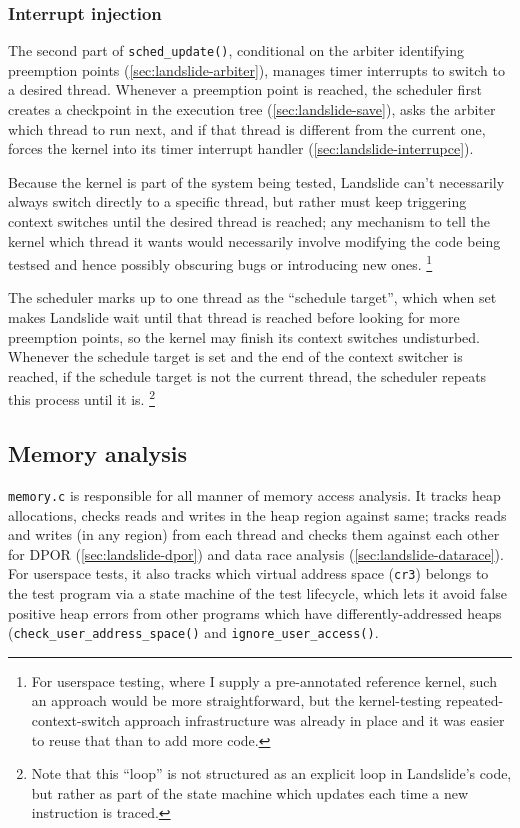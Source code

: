 \subsubsection{Interrupt injection}
\label{sec:landslide-scheduler-interrupce}

The second part of {\tt sched\_update()},
conditional on the arbiter identifying preemption points (\cref{sec:landslide-arbiter}),
manages timer interrupts to switch to a desired thread.
Whenever a preemption point is reached,
the scheduler first creates a checkpoint in the execution tree (\cref{sec:landslide-save}),
asks the arbiter which thread to run next,
and if that thread is different from the current one,
forces the kernel into its timer interrupt handler (\cref{sec:landslide-interrupce}).

Because the kernel is part of the system being tested, Landslide can't necessarily always switch directly to a specific thread,
but rather must keep triggering context switches until the desired thread is reached;
any mechanism to tell the kernel which thread it wants would necessarily involve modifying the code being testsed
and hence possibly obscuring bugs or introducing new ones.%
\footnote{For userspace testing, where I supply a pre-annotated reference kernel,
such an approach would be more straightforward,
but the kernel-testing repeated-context-switch approach infrastructure was already in place
and it was easier to reuse that than to add more code.}

The scheduler marks up to one thread as the ``schedule target'',
which when set makes Landslide wait until that thread is reached before looking for more preemption points,
so the kernel may finish its context switches undisturbed.
Whenever the schedule target is set and the end of the context switcher is reached,
if the schedule target is not the current thread,
the scheduler repeats this process until it is.%
\footnote{Note that this ``loop'' is not structured as an explicit loop in Landslide's code,
but rather as part of the state machine which updates each time a new instruction is traced.}


\subsection{Memory analysis}
\label{sec:landslide-memory}

{\tt memory.c} is responsible for all manner of memory access analysis.
It tracks heap allocations, checks reads and writes in the heap region against same;
tracks reads and writes (in any region) from each thread
and checks them against each other
for DPOR (\cref{sec:landslide-dpor})
and data race analysis (\cref{sec:landslide-datarace}).
For userspace tests, it also tracks which virtual address space ({\tt cr3}) belongs to the test program
via a state machine of the test lifecycle,
which lets it avoid false positive heap errors from other programs which have differently-addressed heaps
({\tt check\_user\_address\_space()} and {\tt ignore\_user\_access()}.

